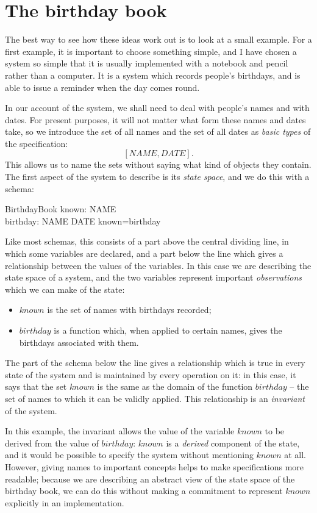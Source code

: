 \section{The birthday book}\label{bb}

The best way to see how these ideas work out is to look at a
small example. For a first example, it is important to
choose something simple, and I have chosen a system so
simple that it is usually implemented with a notebook and
pencil rather than a computer. It is a system which records
people's birthdays, and is able to issue a reminder when the
day comes round.

In our account of the system, we shall need to deal with people's
names and with dates. For present purposes, it will not matter what
form these names and dates take, so we introduce the set of all names
and the set of all dates as {\em basic types\/} of the specification:
\[ [NAME, DATE]. \]
This allows us to name the sets without saying what kind of objects
they contain.
The first aspect of the system to describe is its {\em state space\/},
and we do this with a schema:
\begin{schema}{BirthdayBook}
    known: \power NAME \\
    birthday: NAME \pfun DATE
\where
    known=\dom birthday
\end{schema}
Like most schemas, this consists of a part above the central
dividing line, in which some variables are declared, and a
part below the line which gives a relationship between the
values of the variables. In this case we are describing the
state space of a system, and the two variables represent
important {\em observations\/} which we can make of the
state:
\begin{itemize}
\item $known$ is the set of names with birthdays recorded;
\item $birthday$ is a function which, when applied to certain
names, gives the birthdays associated with them.
\end{itemize}
The part of the schema below the line gives a relationship
which is true in every state of the system and is maintained
by every operation on it: in this case, it says that the set
$known$ is the same as the domain of the function $birthday$
-- the set of names to which it can be validly applied.
This relationship is an {\em invariant\/} of the system.

In this example, the invariant allows the value of the variable
$known$ to be derived from the value of $birthday$: $known$ is a {\em
derived\/}%
component of the state, and it would be possible to
specify the system without mentioning $known$ at all.  However,
giving names to important concepts helps to make specifications more
readable; because we are describing an abstract view of the state space
of the birthday book, we can do this without making a
commitment to represent $known$ explicitly in an implementation.

